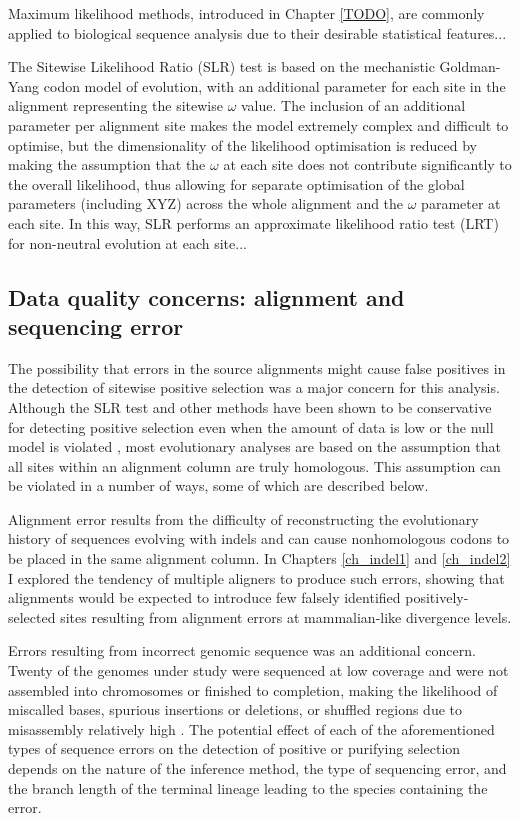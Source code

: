 Maximum likelihood methods, introduced in Chapter \ref{TODO}, are
commonly applied to biological sequence analysis due to their
desirable statistical features...

The Sitewise Likelihood Ratio (SLR) test is based on the mechanistic
Goldman-Yang codon model of evolution, with an additional parameter
for each site in the alignment representing the sitewise $\omega$
value. The inclusion of an additional parameter per alignment site
makes the model extremely complex and difficult to optimise, but the
dimensionality of the likelihood optimisation is reduced by making the
assumption that the $\omega$ at each site does not contribute
significantly to the overall likelihood, thus allowing for separate
optimisation of the global parameters (including XYZ) across the whole
alignment and the $\omega$ parameter at each site. In this way, SLR
performs an approximate likelihood ratio test (LRT) for non-neutral
evolution at each site...

\subsection{Data quality concerns: alignment and sequencing error}

The possibility that errors in the source alignments might cause false
positives in the detection of sitewise positive selection was a major
concern for this analysis. Although the SLR test and other \sw \ml
methods have been shown to be conservative for detecting positive
selection even when the amount of data is low or the null model is
violated \citep{Anisimova2002Properties,Massingham2005Detecting,TODO},
most evolutionary analyses are based on the assumption that all sites
within an alignment column are truly homologous. This assumption can
be violated in a number of ways, some of which are described below.

Alignment error results from the difficulty of reconstructing the
evolutionary history of sequences evolving with indels and can cause
nonhomologous codons to be placed in the same alignment column. In
Chapters \ref{ch_indel1} and \ref{ch_indel2} I explored the tendency
of multiple aligners to produce such errors, showing that \prankc
alignments would be expected to introduce few falsely identified
positively-selected sites resulting from alignment errors at
mammalian-like divergence levels.

Errors resulting from incorrect genomic sequence was an additional
concern. Twenty of the genomes under study were sequenced at low
coverage and were not assembled into chromosomes or finished to
completion, making the likelihood of miscalled bases, spurious
insertions or deletions, or shuffled regions due to misassembly
relatively high \citep{TODO}. The potential effect of each of the
aforementioned types of sequence errors on the detection of positive
or purifying selection depends on the nature of the inference method,
the type of sequencing error, and the branch length of the terminal
lineage leading to the species containing the error.

